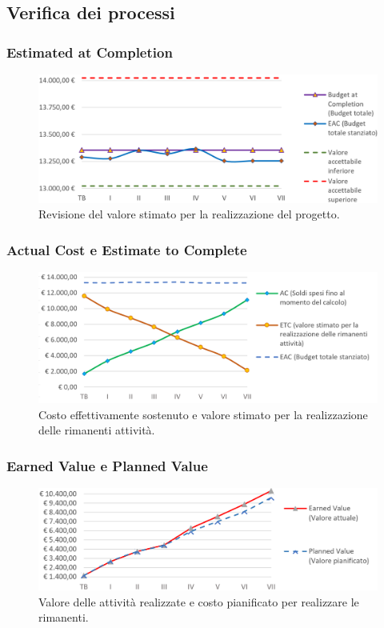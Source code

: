 \subsection{Verifica dei processi}

\subsubsection{Estimated at Completion}
\begin{figure}[h]
	\centering
	\includegraphics[width=17cm]{Images/BAC-EAC}
	\caption{Revisione del valore stimato per la realizzazione del progetto.}
\end{figure}

\newpage

\subsubsection{Actual Cost e Estimate to Complete}
\begin{figure}[h]
	\centering
	\includegraphics[width=17cm]{Images/ETC-AC}
	\caption{Costo effettivamente sostenuto e valore stimato per la realizzazione delle rimanenti attività.}
\end{figure}


\subsubsection{Earned Value e Planned Value}
\begin{figure}[h]
	\centering
	\includegraphics[width=17cm]{Images/EV-PV}
	\caption{Valore delle attività realizzate e costo pianificato per realizzare le rimanenti.}
\end{figure}

